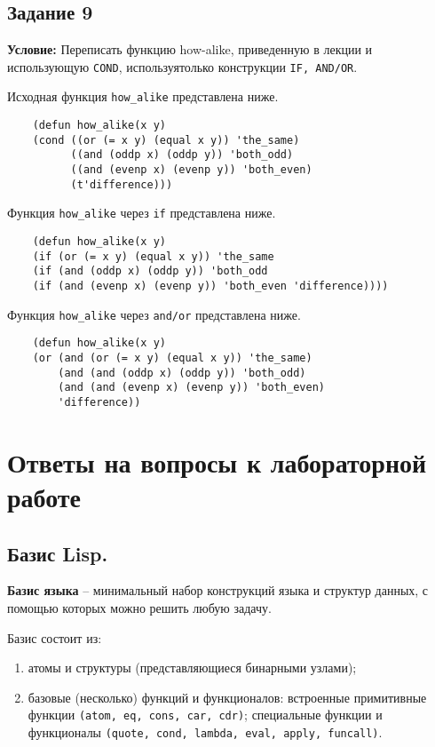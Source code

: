 \section{Задание 9}

\textbf{Условие:} Переписать функцию how-alike, приведенную в лекции и использующую \texttt{COND}, используятолько конструкции \texttt{IF, AND/OR}.

Исходная функция \texttt{how\_alike} представлена ниже.

\begin{lstlisting}
	(defun how_alike(x y)
	(cond ((or (= x y) (equal x y)) 'the_same)
		  ((and (oddp x) (oddp y)) 'both_odd)
		  ((and (evenp x) (evenp y)) 'both_even)
		  (t'difference)))
\end{lstlisting}

Функция \texttt{how\_alike} через \texttt{if} представлена ниже.

\begin{lstlisting}
	(defun how_alike(x y)
	(if (or (= x y) (equal x y)) 'the_same
	(if (and (oddp x) (oddp y)) 'both_odd
	(if (and (evenp x) (evenp y)) 'both_even 'difference))))
\end{lstlisting}

Функция \texttt{how\_alike} через \texttt{and/or} представлена ниже.

\begin{lstlisting}
	(defun how_alike(x y)
	(or (and (or (= x y) (equal x y)) 'the_same)
		(and (and (oddp x) (oddp y)) 'both_odd)
		(and (and (evenp x) (evenp y)) 'both_even)
		'difference))
\end{lstlisting}


\chapter{Ответы на вопросы к лабораторной работе}

\section{Базис Lisp.}

\textbf{Базис языка} -- минимальный набор конструкций языка и структур данных, с помощью которых можно решить любую задачу.

Базис состоит из:
\begin{enumerate}
    \item атомы и структуры (представляющиеся бинарными узлами);
    \item базовые (несколько) функций и функционалов: встроенные примитивные функции \texttt{(atom, eq, cons, car, cdr)}; специальные функции и функционалы \texttt{(quote, cond, lambda, eval, apply, funcall)}.
\end{enumerate}


